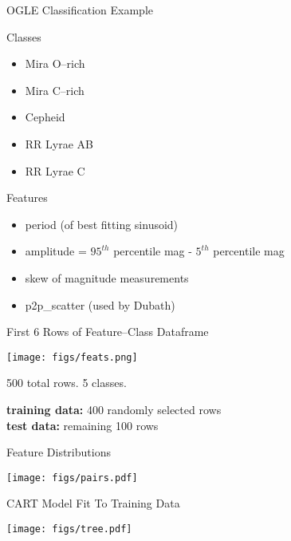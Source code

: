 \documentclass[12pt]{beamer}
\begin{document}
\begin{frame}{OGLE Classification Example}
\begin{block}{Classes}
\begin{itemize}
\item Mira O--rich
\item Mira C--rich
\item Cepheid
\item RR Lyrae AB
\item RR Lyrae C
\end{itemize}
\end{block}

      \begin{block}{Features}
\begin{itemize}
\item period (of best fitting sinusoid)
\item amplitude = $95^{th}$ percentile mag - $5^{th}$ percentile mag
\item skew of magnitude measurements
\item p2p\_scatter (used by Dubath)
\end{itemize}
\end{block}

\end{frame}

\begin{frame}{First 6 Rows of Feature--Class Dataframe}

\begin{center}
\texttt{[image: figs/feats.png]}
\end{center}

\begin{center}
\small{500 total rows. 5 classes.}
\end{center}

\vspace{.1in}
\textbf{training data:} 400 randomly selected rows\\
\textbf{test data:} remaining 100 rows


\end{frame}


\begin{frame}{Feature Distributions}

\texttt{[image: figs/pairs.pdf]}

\end{frame}




\begin{frame}{CART Model Fit To Training Data}

\texttt{[image: figs/tree.pdf]}

\end{frame}
\end{document}

